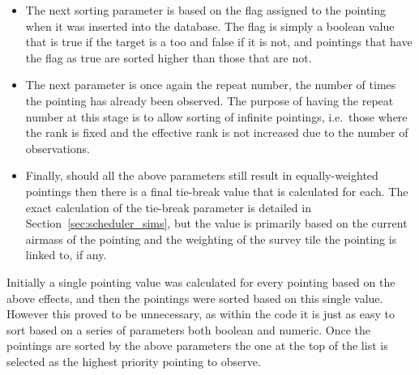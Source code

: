 \begin{colsection}
\begin{colsection}
\begin{itemize}
\item The next sorting parameter is based on the  flag assigned to the pointing when it was inserted into the database. The flag is simply a boolean value that is true if the target is a \gls{too} and false if it is not, and pointings that have the flag as true are sorted higher than those that are not.

\item The next parameter is once again the repeat number, the number of times the pointing has already been observed. The purpose of having the repeat number at this stage is to allow sorting of infinite pointings, i.e.\ those where the rank is fixed and the effective rank is not increased due to the number of observations.

\item Finally, should all the above parameters still result in equally-weighted pointings then there is a final tie-break value that is calculated for each. The exact calculation of the tie-break parameter is detailed in Section~\ref{sec:scheduler_sims}, but the value is primarily based on the current airmass of the pointing and the weighting of the survey tile the pointing is linked to, if any.

\end{itemize}

Initially a single pointing value was calculated for every pointing based on the above effects, and then the pointings were sorted based on this single value. However this proved to be unnecessary, as within the  code it is just as easy to sort based on a series of parameters both boolean and numeric. Once the pointings are sorted by the above parameters the one at the top of the list is selected as the highest priority pointing to observe.


\end{colsection}
\end{colsection}
